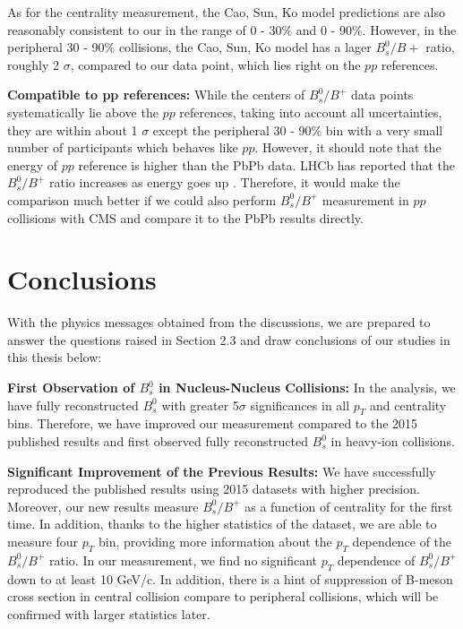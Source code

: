 As for the centrality measurement, the Cao, Sun, Ko model predictions are also reasonably consistent to our in the range of 0 - 30\% and 0 - 90\%. However, in the peripheral 30 - 90\% collisions, the Cao, Sun, Ko model has a lager $B^0_s/B+$ ratio, roughly 2 $\sigma$, compared to our data point, which lies right on the $pp$ references.  


\textbf{Compatible to pp references:} While the centers of $B^0_s/B^+$ data points systematically lie above the $pp$ references, taking into account all uncertainties, they are within about 1 $\sigma$ except the peripheral 30 - 90\% bin with a very small number of participants which behaves like $pp$. However, it should note that the energy of $pp$ reference is higher than the PbPb data. LHCb has reported that the $B^0_s/B^+$ ratio increases as energy goes up \cite{LHCbFF}. Therefore, it would make the comparison much better if we could also perform $B^0_s/B^+$ measurement in $pp$ collisions with CMS and compare it to the PbPb results directly.



\section{Conclusions}


With the physics messages obtained from the discussions, we are prepared to answer the questions raised in Section 2.3 and draw conclusions of our studies in this thesis below:



\textbf{First Observation of $B^0_s$ in Nucleus-Nucleus Collisions:} In the analysis, we have fully reconstructed $B^0_s$ with greater 5$\sigma$ significances in all $p_T$ and centrality bins. Therefore, we have improved our measurement compared to the 2015 published results and first observed fully reconstructed $B^0_s$ in heavy-ion collisions.

\textbf{Significant Improvement of the Previous Results:} We have successfully reproduced the published results using 2015 datasets with higher precision. Moreover, our new results measure $B^0_s/B^+$ as a function of centrality for the first time. In addition, thanks to the higher statistics of the dataset, we are able to measure four $p_T$ bin, providing more information about the $p_T$ dependence of the $B^0_s/B^+$ ratio. In our measurement, we find no significant $p_T$ dependence of $B^0_s/B^+$ down to at least 10 GeV/c. In addition, there is a hint of suppression of B-meson cross section in central collision compare to peripheral collisions, which will be confirmed with larger statistics later. 
 
